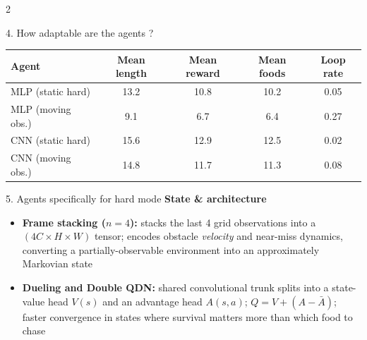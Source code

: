 \documentclass[final]{beamer}
\begin{document}
\begin{frame}[t]
\begin{multicols}{2}
\begin{block}{4. How adaptable are the agents ? }
\begin{center}
\small
\begin{tabular}{lcccc}
\textbf{Agent} & \textbf{Mean length} & \textbf{Mean reward} & \textbf{Mean foods} & \textbf{Loop rate} \\
\hline
MLP (static hard)   & 13.2 & 10.8 & 10.2 & 0.05 \\
MLP (moving obs.)   &  9.1 &  6.7 &  6.4 & 0.27 \\
CNN (static hard)   & 15.6 & 12.9 & 12.5 & 0.02 \\
CNN (moving obs.)   & 14.8 & 11.7 & 11.3 & 0.08 \\
\end{tabular}
\end{center}

\end{block}

\begin{block}{5. Agents specifically for hard mode}
\textbf{State \& architecture}
\begin{itemize}
  \item \textbf{Frame stacking ($n\!=\!4$):} stacks the last 4 grid observations into a $(4C\!\times\!H\!\times\!W)$ tensor; encodes obstacle \emph{velocity} and near-miss dynamics, converting a partially-observable environment into an approximately Markovian state
  \item \textbf{Dueling and Double QDN:} shared convolutional trunk splits into a state-value head $V(s)$ and an advantage head $A(s,a)$; $Q = V + (A - \bar{A})$; faster convergence in states where survival matters more than which food to chase
\end{itemize}


\end{block}
\end{multicols}
\end{frame}
\end{document}
